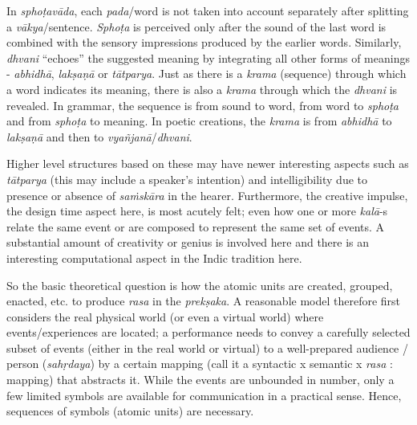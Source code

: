 In \textsl{sphoṭavāda}, each \textsl{pada}/word is not taken into account separately after splitting a \textsl{vākya}/sentence. \textsl{Sphoṭa} is perceived only after the sound of the last word is combined with the sensory impressions produced by the earlier words. Similarly, \textsl{dhvani} “echoes” the suggested meaning by integrating all other forms of meanings - \textsl{abhidhā}, \textsl{lakṣaṇā} or \textsl{tātparya}. Just as there is a \textsl{krama} (sequence) through which a word indicates its meaning, there is also a \textsl{krama} through which the \textsl{dhvani} is revealed. In grammar, the sequence is from sound to word, from word to \textsl{sphoṭa} and from \textsl{sphoṭa} to meaning. In poetic creations, the \textsl{krama} is from \textsl{abhidhā} to \textsl{lakṣaṇā} and then to \textsl{vyañjanā}/\textsl{dhvani}.

Higher level structures based on these may have newer interesting aspects such as \textsl{tātparya} (this may include a speaker’s intention) and intelligibility due to presence or absence of \textsl{saṁskāra} in the hearer. Furthermore, the creative impulse, the design time aspect here, is most acutely felt; even how one or more \textsl{kalā}-s relate the same event or are composed to represent the same set of events. A substantial amount of creativity or genius  is involved here and there is an interesting computational aspect in the Indic tradition here.

So the basic theoretical question is how the atomic units are created, grouped, enacted, etc. to produce \textsl{rasa} in the \textsl{prekṣaka}. A reasonable model therefore first considers the real physical world (or even a virtual world) where events/experiences are located; a performance needs to convey a carefully selected subset of events (either in the real world or virtual) to a well-prepared audience / person (\textsl{sahṛdaya}) by a certain mapping (call it a syntactic x semantic  x \textsl{rasa} : mapping) that abstracts it. While the events are unbounded in number, only a few limited symbols are available for communication in a practical sense. Hence, sequences of symbols (atomic units) are necessary.

